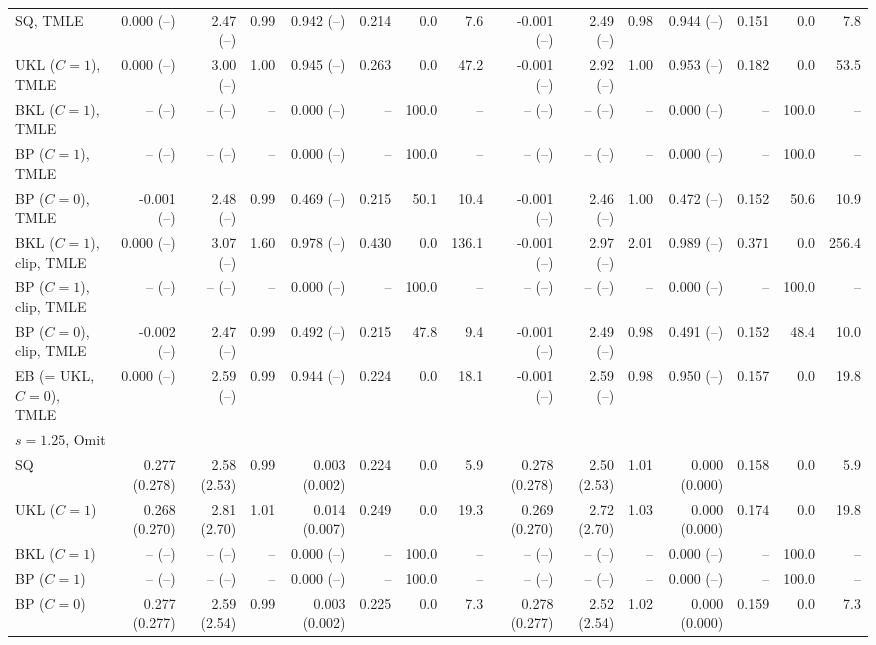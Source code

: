 \begin{tabular}{lrrrrrrrrrrrrrr}
SQ, TMLE & 0.000 (--) & 2.47 (--) & 0.99 & 0.942 (--) & 0.214 & 0.0 & 7.6 & -0.001 (--) & 2.49 (--) & 0.98 & 0.944 (--) & 0.151 & 0.0 & 7.8 \\
UKL ($C=1$), TMLE & 0.000 (--) & 3.00 (--) & 1.00 & 0.945 (--) & 0.263 & 0.0 & 47.2 & -0.001 (--) & 2.92 (--) & 1.00 & 0.953 (--) & 0.182 & 0.0 & 53.5 \\
BKL ($C=1$), TMLE & -- (--) & -- (--) & -- & 0.000 (--) & -- & 100.0 & -- & -- (--) & -- (--) & -- & 0.000 (--) & -- & 100.0 & -- \\
BP ($C=1$), TMLE & -- (--) & -- (--) & -- & 0.000 (--) & -- & 100.0 & -- & -- (--) & -- (--) & -- & 0.000 (--) & -- & 100.0 & -- \\
BP ($C=0$), TMLE & -0.001 (--) & 2.48 (--) & 0.99 & 0.469 (--) & 0.215 & 50.1 & 10.4 & -0.001 (--) & 2.46 (--) & 1.00 & 0.472 (--) & 0.152 & 50.6 & 10.9 \\
BKL ($C=1$), clip, TMLE & 0.000 (--) & 3.07 (--) & 1.60 & 0.978 (--) & 0.430 & 0.0 & 136.1 & -0.001 (--) & 2.97 (--) & 2.01 & 0.989 (--) & 0.371 & 0.0 & 256.4 \\
BP ($C=1$), clip, TMLE & -- (--) & -- (--) & -- & 0.000 (--) & -- & 100.0 & -- & -- (--) & -- (--) & -- & 0.000 (--) & -- & 100.0 & -- \\
BP ($C=0$), clip, TMLE & -0.002 (--) & 2.47 (--) & 0.99 & 0.492 (--) & 0.215 & 47.8 & 9.4 & -0.001 (--) & 2.49 (--) & 0.98 & 0.491 (--) & 0.152 & 48.4 & 10.0 \\
EB (= UKL, $C=0$), TMLE & 0.000 (--) & 2.59 (--) & 0.99 & 0.944 (--) & 0.224 & 0.0 & 18.1 & -0.001 (--) & 2.59 (--) & 0.98 & 0.950 (--) & 0.157 & 0.0 & 19.8 \\
\multicolumn{15}{l}{$s=1.25$, Omit} \\
SQ & 0.277 (0.278) & 2.58 (2.53) & 0.99 & 0.003 (0.002) & 0.224 & 0.0 & 5.9 & 0.278 (0.278) & 2.50 (2.53) & 1.01 & 0.000 (0.000) & 0.158 & 0.0 & 5.9 \\
UKL ($C=1$) & 0.268 (0.270) & 2.81 (2.70) & 1.01 & 0.014 (0.007) & 0.249 & 0.0 & 19.3 & 0.269 (0.270) & 2.72 (2.70) & 1.03 & 0.000 (0.000) & 0.174 & 0.0 & 19.8 \\
BKL ($C=1$) & -- (--) & -- (--) & -- & 0.000 (--) & -- & 100.0 & -- & -- (--) & -- (--) & -- & 0.000 (--) & -- & 100.0 & -- \\
BP ($C=1$) & -- (--) & -- (--) & -- & 0.000 (--) & -- & 100.0 & -- & -- (--) & -- (--) & -- & 0.000 (--) & -- & 100.0 & -- \\
BP ($C=0$) & 0.277 (0.277) & 2.59 (2.54) & 0.99 & 0.003 (0.002) & 0.225 & 0.0 & 7.3 & 0.278 (0.277) & 2.52 (2.54) & 1.02 & 0.000 (0.000) & 0.159 & 0.0 & 7.3 \\

\end{tabular}
